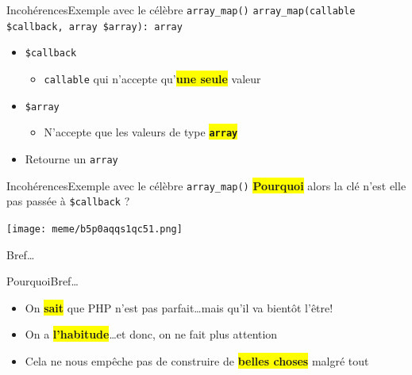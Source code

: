 \begin{frame}{Incohérences}{Exemple avec le célèbre \texttt{array\_map()}}
    \texttt{array\_map(callable \$callback, array \$array): array}

    \pause

    \begin{itemize}[<+->]
        \item \texttt{\$callback}

        \begin{itemize}[<+->]
            \item \texttt{callable} qui n'accepte qu'\colorbox{yellow}{\textbf{une seule}} valeur
        \end{itemize}

        \item \texttt{\$array}

        \begin{itemize}[<+->]
            \item N'accepte que les valeurs de type \colorbox{yellow}{\texttt{\textbf{array}}}
        \end{itemize}

        \item Retourne un \texttt{array}
    \end{itemize}

\end{frame}

\begin{frame}{Incohérences}{Exemple avec le célèbre \texttt{array\_map()}}
    \colorbox{yellow}{\textbf{Pourquoi}} alors la clé n'est elle pas passée à \texttt{\$callback} ?

    \begin{center}
        \texttt{[image: meme/b5p0aqqs1qc51.png]}
    \end{center}
\end{frame}

\begin{frameC}{Bref\ldots}

\end{frameC}

\begin{frame}{Pourquoi}{Bref\ldots}
    \begin{itemize}[<+->]
        \item On \colorbox{yellow}{\textbf{sait}} que PHP n'est pas parfait\ldots \pause[\thebeamerpauses] mais qu'il va bientôt l'être!\pause
        \item On a \colorbox{yellow}{\textbf{l'habitude}}\ldots \pause[\thebeamerpauses] et donc, on ne fait plus attention
        \item Cela ne nous empêche pas de construire de \colorbox{yellow}{\textbf{belles choses}} malgré tout
    \end{itemize}
\end{frame}
